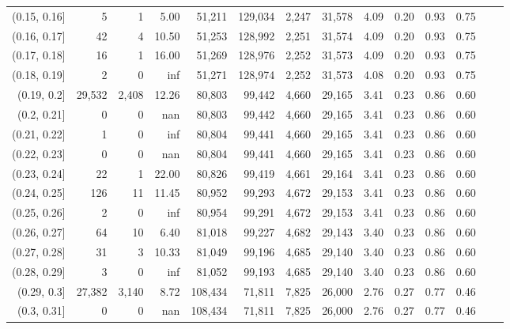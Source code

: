 \begin{tabular}{rrrrrrrrrrrrrr}
(0.15, 0.16]   &       5 &      1 &   5.00 &   51,211 &  129,034 &   2,247 &  31,578 &  4.09 &  0.20 &  0.93 &      0.75 \\
(0.16, 0.17]   &      42 &      4 &  10.50 &   51,253 &  128,992 &   2,251 &  31,574 &  4.09 &  0.20 &  0.93 &      0.75 \\
(0.17, 0.18]   &      16 &      1 &  16.00 &   51,269 &  128,976 &   2,252 &  31,573 &  4.09 &  0.20 &  0.93 &      0.75 \\
(0.18, 0.19]   &       2 &      0 &    inf &   51,271 &  128,974 &   2,252 &  31,573 &  4.08 &  0.20 &  0.93 &      0.75 \\
(0.19, 0.2]    &  29,532 &  2,408 &  12.26 &   80,803 &   99,442 &   4,660 &  29,165 &  3.41 &  0.23 &  0.86 &      0.60 \\
(0.2, 0.21]    &       0 &      0 &    nan &   80,803 &   99,442 &   4,660 &  29,165 &  3.41 &  0.23 &  0.86 &      0.60 \\
(0.21, 0.22]   &       1 &      0 &    inf &   80,804 &   99,441 &   4,660 &  29,165 &  3.41 &  0.23 &  0.86 &      0.60 \\
(0.22, 0.23]   &       0 &      0 &    nan &   80,804 &   99,441 &   4,660 &  29,165 &  3.41 &  0.23 &  0.86 &      0.60 \\
(0.23, 0.24]   &      22 &      1 &  22.00 &   80,826 &   99,419 &   4,661 &  29,164 &  3.41 &  0.23 &  0.86 &      0.60 \\
(0.24, 0.25]   &     126 &     11 &  11.45 &   80,952 &   99,293 &   4,672 &  29,153 &  3.41 &  0.23 &  0.86 &      0.60 \\
(0.25, 0.26]   &       2 &      0 &    inf &   80,954 &   99,291 &   4,672 &  29,153 &  3.41 &  0.23 &  0.86 &      0.60 \\
(0.26, 0.27]   &      64 &     10 &   6.40 &   81,018 &   99,227 &   4,682 &  29,143 &  3.40 &  0.23 &  0.86 &      0.60 \\
(0.27, 0.28]   &      31 &      3 &  10.33 &   81,049 &   99,196 &   4,685 &  29,140 &  3.40 &  0.23 &  0.86 &      0.60 \\
(0.28, 0.29]   &       3 &      0 &    inf &   81,052 &   99,193 &   4,685 &  29,140 &  3.40 &  0.23 &  0.86 &      0.60 \\
(0.29, 0.3]    &  27,382 &  3,140 &   8.72 &  108,434 &   71,811 &   7,825 &  26,000 &  2.76 &  0.27 &  0.77 &      0.46 \\
(0.3, 0.31]    &       0 &      0 &    nan &  108,434 &   71,811 &   7,825 &  26,000 &  2.76 &  0.27 &  0.77 &      0.46 \\

\end{tabular}
